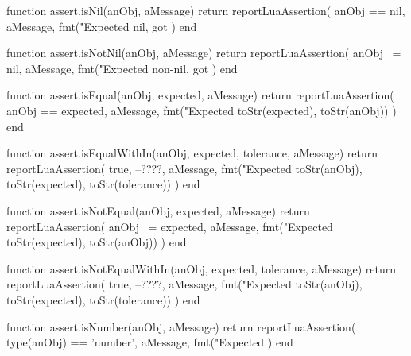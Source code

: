\startLuaCode
function assert.isNil(anObj, aMessage)
  return reportLuaAssertion(
    anObj == nil,
    aMessage,
    fmt("Expected nil, got %
  )
end
\stopLuaCode

\stopTestSuite


\startLuaCode
function assert.isNotNil(anObj, aMessage)
  return reportLuaAssertion(
    anObj ~= nil,
    aMessage,
    fmt("Expected non-nil, got %
  )
end
\stopLuaCode

\stopTestSuite


\startLuaCode
function assert.isEqual(anObj, expected, aMessage)
  return reportLuaAssertion(
    anObj == expected,
    aMessage,
    fmt("Expected %
      toStr(expected), toStr(anObj))
  )
end
\stopLuaCode

\stopTestSuite


\startLuaCode
function assert.isEqualWithIn(anObj, expected,
  tolerance, aMessage)
  return reportLuaAssertion(
    true, --????,
    aMessage,
    fmt("Expected %
      toStr(anObj), toStr(expected), toStr(tolerance))
  )
end
\stopLuaCode

\stopTestSuite


\startLuaCode
function assert.isNotEqual(anObj, expected, aMessage)
  return reportLuaAssertion(
    anObj ~= expected,
    aMessage,
    fmt("Expected %
      toStr(expected), toStr(anObj))
  )
end
\stopLuaCode

\stopTestSuite

\startLuaCode
function assert.isNotEqualWithIn(anObj, expected,
  tolerance, aMessage)
  return reportLuaAssertion(
    true, --????,
    aMessage,
    fmt("Expected %
      toStr(anObj), toStr(expected), toStr(tolerance))
  )
end
\stopLuaCode

\stopTestSuite


\startLuaCode
function assert.isNumber(anObj, aMessage)
  return reportLuaAssertion(
    type(anObj) == 'number',
    aMessage,
    fmt("Expected %
  )
end
\stopLuaCode


